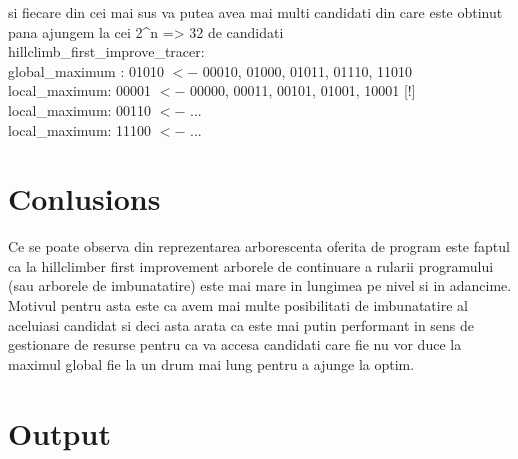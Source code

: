 \documentclass{article}
\begin{document}
si fiecare din cei mai sus va putea avea mai multi candidati din care este obtinut pana ajungem la cei 2^n => 32 de candidati \\

hillclimb\_first\_improve\_tracer:\\
global\_maximum : 01010 $<-$ 00010, 01000, 01011, 01110, 11010 \\
local\_maximum: 00001 $<-$  00000, 00011, 00101, 01001, 10001 [!] \\
local\_maximum: 00110 $<-$  ... \\
local\_maximum: 11100 $<-$  ... \\

\section{Conlusions}

Ce se poate observa din reprezentarea arborescenta oferita de program este faptul ca la hillclimber first improvement arborele de continuare a rularii programului (sau arborele de imbunatatire) este mai mare in lungimea pe nivel si in adancime. Motivul pentru asta este ca avem mai multe posibilitati de imbunatatire al aceluiasi candidat si deci asta arata ca este mai putin performant in sens de gestionare de resurse pentru ca va accesa candidati care fie nu vor duce la maximul global fie la un drum mai lung pentru a ajunge la optim.

\section{Output}
\end{document}

